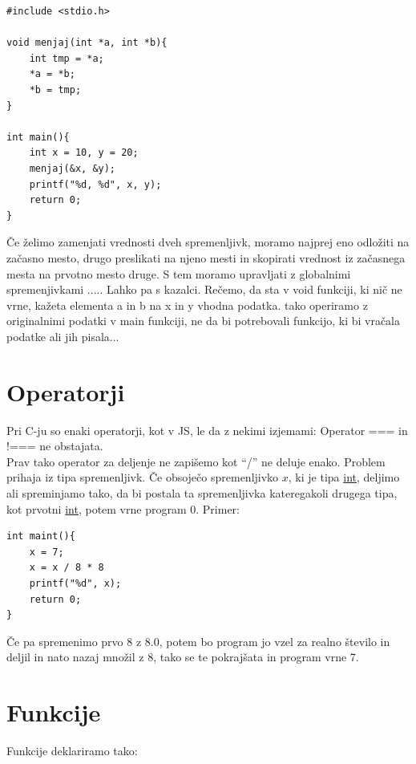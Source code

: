 \documentclass[a4paper, 12pt]{article}
\begin{document}
\pagebreak

\begin{lstlisting}[caption = Menjava vrednosti elementov s kazalci]
#include <stdio.h>

void menjaj(int *a, int *b){
	int tmp = *a;
	*a = *b;
	*b = tmp;
}

int main(){
	int x = 10, y = 20;
	menjaj(&x, &y);
	printf("%d, %d", x, y);
	return 0;
}
\end{lstlisting}

Če želimo zamenjati vrednosti dveh spremenljivk, moramo najprej eno odložiti na začasno mesto, drugo preslikati na njeno mesti in skopirati vrednost iz začasnega mesta na prvotno mesto druge. S tem moramo upravljati z globalnimi spremenjivkami ..... Lahko pa s kazalci. Rečemo, da sta v void funkciji, ki nič ne vrne, kažeta elementa a in b na x in y vhodna podatka. tako operiramo z originalnimi podatki v main funkciji, ne da bi potrebovali funkcijo, ki bi vračala podatke ali jih pisala...



\section{Operatorji}
Pri C-ju so enaki operatorji, kot v JS, le da z nekimi izjemami: Operator === in !=== ne obstajata.\\
Prav tako operator za deljenje ne zapišemo kot ``/'' ne deluje enako. Problem prihaja iz tipa spremenljivk. Če obsoječo spremenljivko $x$, ki je tipa \underline{int}, deljimo ali spreminjamo tako, da bi postala ta spremenljivka kateregakoli drugega tipa, kot prvotni \underline{int}, potem vrne program 0. Primer:
\begin{lstlisting}
int maint(){	
	x = 7;
	x = x / 8 * 8
	printf("%d", x);
	return 0;
}
\end{lstlisting}
Če pa spremenimo prvo 8 z 8.0, potem bo program jo vzel za realno število in deljil in nato nazaj množil z 8, tako se te pokrajšata in program vrne 7.

\pagebreak
\section{Funkcije}
Funkcije deklariramo tako:

\begin{center}
\end{center}
\end{document}

